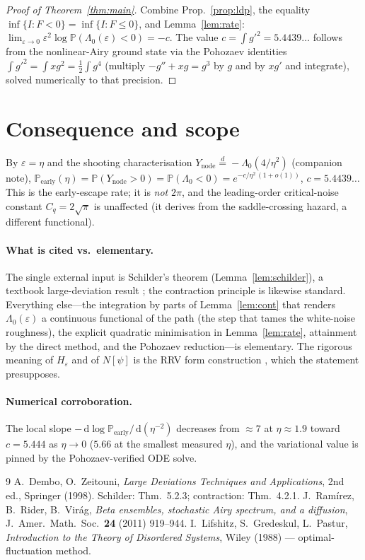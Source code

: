 \documentclass[11pt]{article}
\theoremstyle{remark}
\newcommand{\dd}{\,\mathrm{d}}
\newcommand{\Lam}{\Lambda_0}
\begin{document}
\begin{proof}[Proof of Theorem~\ref{thm:main}]
Combine Prop.~\ref{prop:ldp}, the equality $\inf\{I:F<0\}=\inf\{I:F\le0\}$, and
Lemma~\ref{lem:rate}:
$\lim_{\varepsilon\to0}\varepsilon^2\log\mathbb P(\Lam(\varepsilon)<0)=-c$. The value
$c=\int g'^2=5.4439\ldots$ follows from the nonlinear-Airy ground state via the Pohozaev
identities $\int g'^2=\int xg^2=\tfrac12\int g^4$ (multiply $-g''+xg=g^3$ by $g$ and by
$xg'$ and integrate), solved numerically to that precision.
\end{proof}

\section{Consequence and scope}

By $\varepsilon=\eta$ and the shooting characterisation $Y_{\mathrm{node}}\stackrel
{d}{=}-\Lam(4/\eta^2)$ (companion note), $\mathbb P_{\mathrm{early}}(\eta)=\mathbb
P(Y_{\mathrm{node}}>0)=\mathbb P(\Lam<0)=e^{-c/\eta^2\,(1+o(1))}$, $c=5.4439\ldots$ This
is the early-escape rate; it is \emph{not} $2\pi$, and the leading-order critical-noise
constant $C_q=2\sqrt\pi$ is unaffected (it derives from the saddle-crossing hazard, a
different functional).

\paragraph{What is cited vs.\ elementary.} The single external input is Schilder's
theorem (Lemma~\ref{lem:schilder}), a textbook large-deviation result \cite{DZ}; the
contraction principle is likewise standard. Everything else---the integration by parts
of Lemma~\ref{lem:cont} that renders $\Lam(\varepsilon)$ a continuous functional of the
path (the step that tames the white-noise roughness), the explicit quadratic
minimisation in Lemma~\ref{lem:rate}, attainment by the direct method, and the Pohozaev
reduction---is elementary. The rigorous meaning of $H_\varepsilon$ and of $N[\psi]$ is
the RRV form construction \cite{RRV}, which the statement presupposes.

\paragraph{Numerical corroboration.} The local slope
$-\dd\log\mathbb P_{\mathrm{early}}/\dd(\eta^{-2})$ decreases from ${\approx}7$ at
$\eta\approx1.9$ toward $c=5.444$ as $\eta\to0$ ($5.66$ at the smallest measured
$\eta$), and the variational value is pinned by the Pohozaev-verified ODE solve.

\begin{thebibliography}{9}
 A.~Dembo, O.~Zeitouni, \emph{Large Deviations Techniques and Applications},
2nd ed., Springer (1998). Schilder: Thm.~5.2.3; contraction: Thm.~4.2.1.
 J.~Ram\'irez, B.~Rider, B.~Vir\'ag, \emph{Beta ensembles, stochastic Airy
spectrum, and a diffusion}, J.\ Amer.\ Math.\ Soc.\ \textbf{24} (2011) 919--944.
 I.~Lifshitz, S.~Gredeskul, L.~Pastur, \emph{Introduction to the Theory
of Disordered Systems}, Wiley (1988) --- optimal-fluctuation method.
\end{thebibliography}
\end{document}
